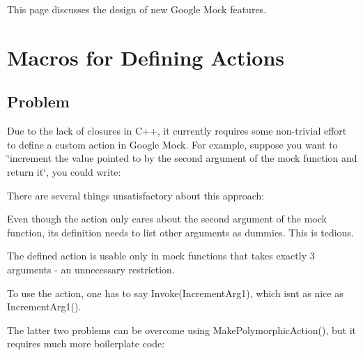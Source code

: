 This page discusses the design of new Google Mock features.

\section*{Macros for Defining Actions}

\subsection*{Problem}

Due to the lack of closures in C++, it currently requires some non-\/trivial effort to define a custom action in Google Mock. For example, suppose you want to \char`\"{}increment the value pointed to by the
second argument of the mock function and return it\char`\"{}, you could write\+:


\begin{DoxyCode}{0}
\DoxyCodeLine{\}}
\DoxyCodeLine{}
\end{DoxyCode}


There are several things unsatisfactory about this approach\+:


\begin{DoxyItemize}
\item Even though the action only cares about the second argument of the mock function, its definition needs to list other arguments as dummies. This is tedious.
\item The defined action is usable only in mock functions that takes exactly 3 arguments -\/ an unnecessary restriction.
\item To use the action, one has to say {\ttfamily Invoke(\+Increment\+Arg1)}, which isn\textquotesingle{}t as nice as {\ttfamily Increment\+Arg1()}.
\end{DoxyItemize}

The latter two problems can be overcome using {\ttfamily Make\+Polymorphic\+Action()}, but it requires much more boilerplate code\+:


\begin{DoxyCode}{0}
\DoxyCodeLine{  \}}
\DoxyCodeLine{\};}
\DoxyCodeLine{}
\DoxyCodeLine{\}}
\DoxyCodeLine{}
\end{DoxyCode}


